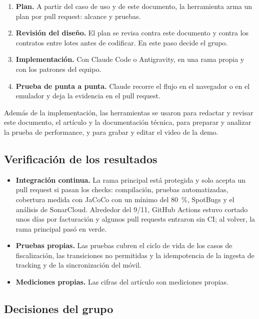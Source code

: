 \begin{enumerate}
    \item \textbf{Plan.} A partir del caso de uso y de este documento, la herramienta arma un plan por pull request: alcance y pruebas.
    \item \textbf{Revisión del diseño.} El plan se revisa contra este documento y contra los contratos entre lotes antes de codificar. En este paso decide el grupo.
    \item \textbf{Implementación.} Con Claude Code o Antigravity, en una rama propia y con los patrones del equipo.
    \item \textbf{Prueba de punta a punta.} Claude recorre el flujo en el navegador o en el emulador y deja la evidencia en el pull request.
\end{enumerate}

Además de la implementación, las herramientas se usaron para redactar y revisar este documento, el artículo y la documentación técnica, para preparar y analizar la prueba de performance, y para grabar y editar el video de la demo.

\subsection{Verificación de los resultados}

\begin{itemize}
    \item \textbf{Integración continua.} La rama principal está protegida y solo acepta un pull request si pasan los checks: compilación, pruebas automatizadas, cobertura medida con JaCoCo con un mínimo del 80~\%, SpotBugs y el análisis de SonarCloud. Alrededor del 9/11, GitHub Actions estuvo cortado unos días por facturación y algunos pull requests entraron sin CI; al volver, la rama principal pasó en verde.
    \item \textbf{Pruebas propias.} Las pruebas cubren el ciclo de vida de los casos de fiscalización, las transiciones no permitidas y la idempotencia de la ingesta de tracking y de la sincronización del móvil.
    \item \textbf{Mediciones propias.} Las cifras del artículo son mediciones propias.
\end{itemize}

\subsection{Decisiones del grupo}

